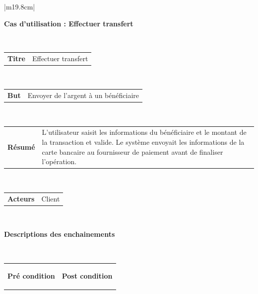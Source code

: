\begin{table}[h]
	\hspace*{-2cm}
	\vspace*{-2cm}
	\begin{tabular}{|m{19.8cm}|}
		\hline
		\begin{center}
			\textbf{Cas d’utilisation : Effectuer transfert}
		\end{center}
		\\
		[-4ex] 
		\hline
		\begin{tabular}{m{3cm}|m{14cm}}
			
			\centering 	\textbf{Titre} & Effectuer transfert
			\\
			[0ex] 
		\end{tabular}
		\\
		
		\hline
		\begin{tabular}{m{3cm}|m{14cm}}
			
			\centering 	\textbf{But} & Envoyer de l’argent à un bénéficiaire	\\
			[0ex] 
			
		\end{tabular}
		\\
		\hline
		\begin{tabular}{m{3cm}|m{15.5cm}}
			
			\centering 	\textbf{Résumé} & L’utilisateur saisit les informations du bénéficiaire et le montant de la transaction et valide. Le système envoyait les informations de la carte bancaire au  fournisseur de paiement  avant de finaliser l’opération.
			\\
			[0ex] 
		\end{tabular}
		\\
		
		\hline
		\begin{tabular}{m{3cm}|m{14cm}}
			
			\centering 	\textbf{Acteurs } & Client \\[0ex]
			
		\end{tabular}
		\\
		
		\hline
		\begin{center}
			\textbf{Descriptions des enchainements}
		\end{center}
		\\
		[-4ex] 
		\hline	
		\begin{tabular}{m{9.3cm}|m{9.3cm}}
			
			\begin{center}
				\textbf{Pré condition}
			\end{center}
			& 
			\begin{center}
				\textbf{Post condition}
			\end{center}
			\\[-4ex]
		\end{tabular}
		\\
		

\end{tabular}
\end{table}
